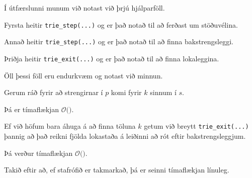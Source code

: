 {
	{
		\item<1-> Í útfærslunni munum við notast við þrjú hjálparföll.
		\item<2-> Fyrsta heitir \texttt{trie\_step(...)} og er það notað til að ferðast um stöðuvélina.
		\item<3-> Annað heitir \texttt{trie\_step(...)} og er það notað til að finna bakstrengsleggi.
		\item<4-> Þriðja heitir \texttt{trie\_exit(...)} og er það notað til að finna lokaleggina.
		\item<5-> Öll þessi föll eru endurkvæm og notast við minnun.
	}
}

{
}

{
}

{
}

{
	{
		\item<1-> Gerum ráð fyrir að strengirnar í $p$ komi fyrir $k$ sinnum í $s$.
		\item<2-> Þá er tímaflækjan $\mathcal{O}($\onslide<3->{$|s| + |\Sigma| \cdot |p| + k$}$)$.
		\item<4-> Ef við höfum bara áhuga á að finna töluna $k$ getum við breytt \texttt{trie\_exit(...)}
					þannig að það reikni fjölda lokastaða á leiðinni að rót eftir bakstrengsleggjum.
		\item<5-> Þá verður tímaflækjan $\mathcal{O}($\onslide<6->{$|s| + |\Sigma| \cdot |p|$}$)$.
		\item<7-> Takið eftir að, ef stafrófið er takmarkað, þá er seinni tímaflækjan línuleg.
	}
}

{
}


